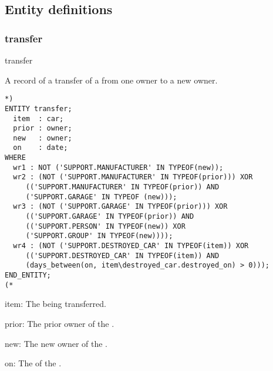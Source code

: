 \documentclass{article}
\begin{document}
\subsection{Entity definitions}

\subsubsection{transfer}

\begin{Mnamedesc}{transfer}
\begin{Mdesctext}
    A record of a transfer of a  from one owner to a new owner.
\end{Mdesctext}

\begin{Mexp}
\begin{verbatim}
*)
ENTITY transfer;
  item  : car;
  prior : owner;
  new   : owner;
  on    : date;
WHERE
  wr1 : NOT ('SUPPORT.MANUFACTURER' IN TYPEOF(new));
  wr2 : (NOT ('SUPPORT.MANUFACTURER' IN TYPEOF(prior))) XOR
     (('SUPPORT.MANUFACTURER' IN TYPEOF(prior)) AND
     ('SUPPORT.GARAGE' IN TYPEOF (new)));
  wr3 : (NOT ('SUPPORT.GARAGE' IN TYPEOF(prior))) XOR
     (('SUPPORT.GARAGE' IN TYPEOF(prior)) AND
     (('SUPPORT.PERSON' IN TYPEOF(new)) XOR
     ('SUPPORT.GROUP' IN TYPEOF(new))));
  wr4 : (NOT ('SUPPORT.DESTROYED_CAR' IN TYPEOF(item)) XOR
     (('SUPPORT.DESTROYED_CAR' IN TYPEOF(item)) AND
     (days_between(on, item\destroyed_car.destroyed_on) > 0)));
END_ENTITY;
(*
\end{verbatim}
\end{Mexp}

\begin{Matts}

\item[item:] The  being transferred.

\item[prior:] The prior owner of the .

\item[new:] The new owner of the .

\item[on:] The  of the .
\end{Matts}

\begin{Mprops}


\end{Mprops}
\end{Mnamedesc}
\end{document}
